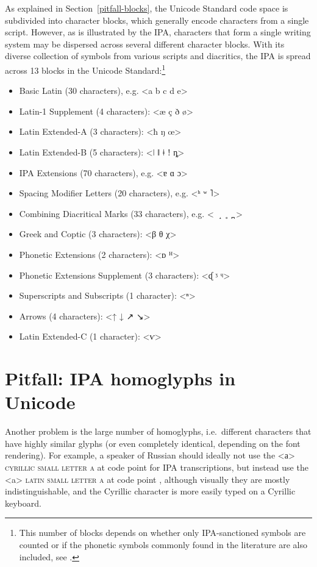 As explained in Section~\ref{pitfall-blocks}, the Unicode Standard code space is
subdivided into character blocks, which generally encode characters from a
single script. However, as is illustrated by the IPA, characters that form a
single writing system may be dispersed across several different character
blocks. With its diverse collection of symbols from various scripts and
diacritics, the IPA is spread across 13 blocks in the Unicode
Standard:\footnote{This number of blocks depends on whether only IPA-sanctioned
symbols are counted or if the phonetic symbols commonly found in the literature
are also included, see \cite[Appendix C]{Moran2012}.}

\begin{itemize}
	\item Basic Latin (30 characters), e.g. <a b c d e> 
	\item Latin-1 Supplement (4 characters): <æ ç ð ø> 
	\item Latin Extended-A (3 characters): <ħ ŋ œ> 
	\item Latin Extended-B (5 characters): <ǀ ǁ ǂ ǃ ȵ> 
	\item IPA Extensions (70 characters), e.g. <ɐ ɑ ɔ> 
	\item Spacing Modifier Letters (20 characters), e.g. <ʰ ʷ ˥> 
	\item Combining Diacritical Marks (33 characters), e.g. <{\large \ \ ̝\ \ ̥\ \ ̪ }> 
	\item Greek and Coptic (3 characters): <β θ χ> 
	\item Phonetic Extensions (2 characters): <{\small {}ᴅ ᴴ}> 
	\item Phonetic Extensions Supplement (3 characters): <{\small {}ᶑ ᶾ ᶣ}> 
	\item Superscripts and Subscripts (1 character): <ⁿ> 
	\item Arrows (4 characters): <↑ ↓ ↗ ↘>
	\item Latin Extended-C (1 character): <{\small {}ⱱ}> 
\end{itemize}

\section{Pitfall: IPA homoglyphs in Unicode}
\label{pitfall-ipa-homoglyphs}

Another problem is the large number of homoglyphs, i.e.~different characters
that have highly similar glyphs (or even completely identical, depending on the
font rendering). For example, a speaker of Russian should ideally not use the
<а> \textsc{cyrillic small letter a} at code point  for IPA
transcriptions, but instead use the <a> \textsc{latin small letter a} at code point
, although visually they are mostly indistinguishable, and the
Cyrillic character is more easily typed on a Cyrillic keyboard. 

